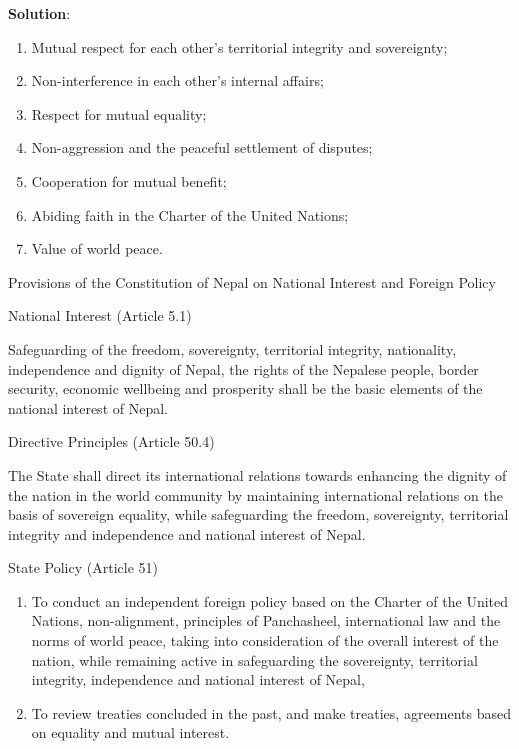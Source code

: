 \documentclass[
]{book}
\newenvironment{solution}{ {\bfseries Solution}:}{}
\begin{document}
\begin{questions}
\begin{solution}
\begin{enumerate}
\item Mutual respect for each other’s territorial integrity and sovereignty;
\item Non-interference in each other’s internal affairs;
\item Respect for mutual equality;
\item Non-aggression and the peaceful settlement of disputes;
\item Cooperation for mutual benefit;
\item Abiding faith in the Charter of the United Nations;
\item Value of world peace.
\end{enumerate}

Provisions of the Constitution of Nepal on National Interest and Foreign Policy

National Interest (Article 5.1)

Safeguarding of the freedom, sovereignty, territorial integrity, nationality, independence and dignity of Nepal, the rights of the Nepalese people, border security, economic wellbeing and prosperity shall be the basic elements of the national interest of Nepal.

Directive Principles (Article 50.4)

The State shall direct its international relations towards enhancing the dignity of the nation in the world community by maintaining international relations on the basis of sovereign equality, while safeguarding the freedom, sovereignty, territorial integrity and independence and national interest of Nepal.

State Policy (Article 51)

\begin{enumerate}
\item To conduct an independent foreign policy based on the Charter of the United Nations, non-alignment, principles of Panchasheel, international law and the norms of world peace, taking into consideration of the overall interest of the nation, while remaining active in safeguarding the sovereignty, territorial integrity, independence and national interest of Nepal,
\item To review treaties concluded in the past, and make treaties, agreements based on equality and mutual interest.
\end{enumerate}


\end{solution}
\end{questions}
\end{document}
